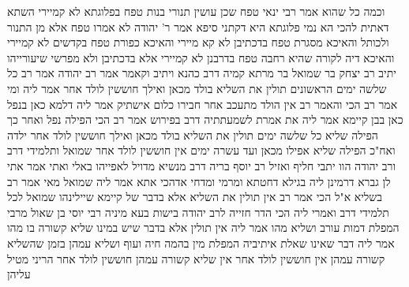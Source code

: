 \documentclass[12pt, openany]{book}
\begin{document}
{וכמה כל שהוא אמר רבי ינאי טפח שכן עושין תנורי בנות טפח בפלוגתא לא קמיירי 
השתא דאתית להכי הא נמי פלוגתא היא דקתני סיפא אמר ר' יהודה לא אמרו טפח אלא מן התנור ולכותל 
והאיכא מסגרת טפח בדכתיבן לא קא מיירי והאיכא כפורת טפח בקדשים לא קמיירי 
והאיכא דיה לקורה שהיא רחבה טפח בדרבנן לא קמיירי אלא בדכתיבן ולא מפרשי שיעורייהו 
יתיב רב יצחק בר שמואל בר מרתא קמיה דרב כהנא ויתיב וקאמר אמר רב יהודה אמר רב כל שלשה ימים הראשונים תולין את השליא בולד מכאן ואילך חוששין לולד אחר 
אמר ליה ומי אמר רב הכי והאמר רב אין הולד מתעכב אחר חבירו כלום אישתיק אמר ליה דלמא כאן בנפל כאן בבן קיימא 
אמר ליה את אמרת לשמעתתיה דרב בפירוש אמר רב הכי הפילה נפל ואחר כך הפילה שליא כל שלשה ימים תולין את השליא בולד מכאן ואילך חוששין לולד אחר ילדה ואח"כ הפילה שליא אפילו מכאן ועד עשרה ימים אין חוששין לולד אחר 
שמואל ותלמידי דרב ורב יהודה הוו יתבי חליף ואזיל רב יוסף בריה דרב מנשיא מדויל לאפייהו באלי ואתי אמר אתי לן גברא דרמינן ליה בגילא דחטתא ומרמי ומדחי 
אדהכי אתא אמר ליה שמואל מאי אמר רב בשליא א"ל הכי אמר רב אין תולין את השליא אלא בדבר של קיימא שיילינהו שמואל לכל תלמידי דרב ואמרי ליה הכי הדר חזייה לרב יהודה בישות 
בעא מיניה רבי יוסי בן שאול מרבי המפלת דמות עורב ושליא מהו אמר ליה אין תולין אלא בדבר שיש במינו שליא 
קשורה בו מהו אמר ליה דבר שאינו שאלת איתיביה המפלת מין בהמה חיה ועוף ושליא עמהן בזמן שהשליא קשורה עמהן אין חוששין לולד אחר אין שליא קשורה עמהן חוששין לולד אחר הריני מטיל עליהן}
\end{document}
